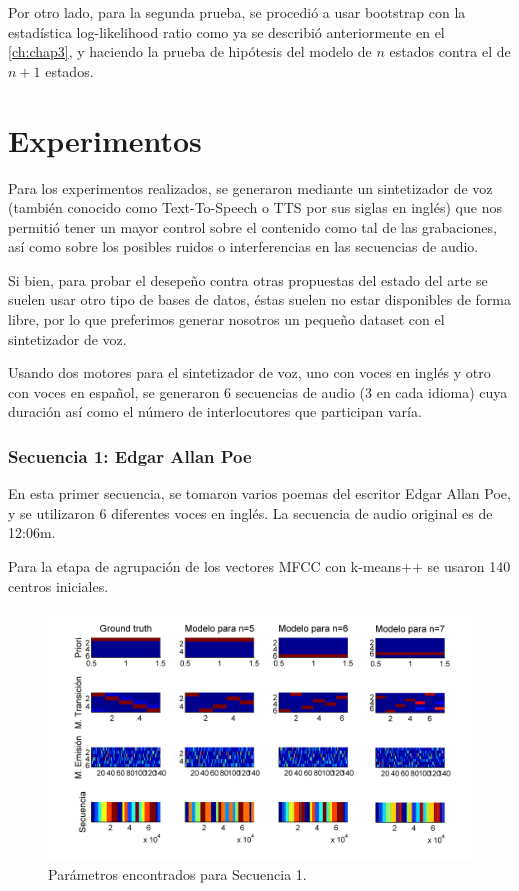 Por otro lado, para la segunda prueba, se procedió a usar bootstrap con la estadística log-likelihood ratio como ya se describió anteriormente en el \autoref{ch:chap3}, y haciendo la prueba de hipótesis del modelo de $n$ estados contra el de $n+1$ estados.

\section{Experimentos} %
\label{sec:experimentos}

Para los experimentos realizados, se generaron mediante un sintetizador de voz (también conocido como Text-To-Speech o TTS por sus siglas en inglés) que nos permitió tener un mayor control sobre el contenido como tal de las grabaciones, así como sobre los posibles ruidos o interferencias en las secuencias de audio.

Si bien, para probar el desepeño contra otras propuestas del estado del arte se suelen usar otro tipo de bases de datos, éstas suelen no estar disponibles de forma libre, por lo que preferimos generar nosotros un pequeño dataset con el sintetizador de voz.

Usando dos motores para el sintetizador de voz, uno con voces en inglés y otro con voces en español, se generaron 6 secuencias de audio (3 en cada idioma) cuya duración así como el número de interlocutores que participan varía.

\subsubsection{Secuencia 1: Edgar Allan Poe} %
\label{ssub:calderon}

En esta primer secuencia, se tomaron varios poemas del escritor Edgar Allan Poe, y se utilizaron 6 diferentes voces en inglés. La secuencia de audio original es de 12:06m.

Para la etapa de agrupación de los vectores MFCC con k-means++ se usaron 140 centros iniciales.

\setlength{\abovecaptionskip}{-10pt plus 0pt minus 0pt}

\begin{figure}[H]
  \centerline
  {\includegraphics[width=1.3\linewidth]{gfx/chap6/cuervo1}} \quad
  \caption{Parámetros encontrados para Secuencia 1.}
  \label{fig:prb1_par}
\end{figure}

